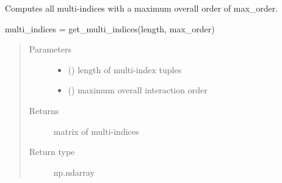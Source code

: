 \documentclass[letterpaper,10pt,english,openany,oneside]{sphinxmanual}
\begin{document}

\begin{fulllineitems}
\label{\detokenize{pygpc:pygpc.misc.get_multi_indices_max_order}}
Computes all multi-indices with a maximum overall order of max\_order.

multi\_indices = get\_multi\_indices(length, max\_order)
\begin{quote}\begin{description}
\item[{Parameters}] \leavevmode\begin{itemize}
\item {} 
 () \textendash{} length of multi-index tuples

\item {} 
 () \textendash{} maximum overall interaction order

\end{itemize}

\item[{Returns}] \leavevmode
{} \textendash{} matrix of multi-indices

\item[{Return type}] \leavevmode
np.ndarray

\end{description}\end{quote}

\end{fulllineitems}

\end{document}
